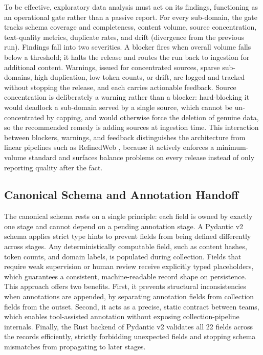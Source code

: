 \documentclass[conference]{IEEEtran}
\begin{document}
To be effective, exploratory data analysis must act on its findings, functioning as an operational gate rather than a passive report. For every sub-domain, the gate tracks schema coverage and completeness, content volume, source concentration, text-quality metrics, duplicate rates, and drift (divergence from the previous run). Findings fall into two severities. A blocker fires when overall volume falls below a threshold; it halts the release and routes the run back to ingestion for additional content. Warnings, issued for concentrated sources, sparse sub-domains, high duplication, low token counts, or drift, are logged and tracked without stopping the release, and each carries actionable feedback. Source concentration is deliberately a warning rather than a blocker: hard-blocking it would deadlock a sub-domain served by a single source, which cannot be un-concentrated by capping, and would otherwise force the deletion of genuine data, so the recommended remedy is adding sources at ingestion time. This interaction between blockers, warnings, and feedback distinguishes the architecture from linear pipelines such as RefinedWeb \cite{penedo2023refinedweb}, because it actively enforces a minimum-volume standard and surfaces balance problems on every release instead of only reporting quality after the fact.

\subsection{Canonical Schema and Annotation Handoff}

The canonical schema rests on a single principle: each field is owned by exactly one stage and cannot depend on a pending annotation stage. A Pydantic v2 schema \cite{pydanticv2} applies strict type hints to prevent fields from being defined differently across stages. Any deterministically computable field, such as content hashes, token counts, and domain labels, is populated during collection. Fields that require weak supervision or human review receive explicitly typed placeholders, which guarantees a consistent, machine-readable record shape on persistence. This approach offers two benefits. First, it prevents structural inconsistencies when annotations are appended, by separating annotation fields from collection fields from the outset. Second, it acts as a precise, static contract between teams, which enables tool-assisted annotation \cite{wang2023selfinstruct} without exposing collection-pipeline internals. Finally, the Rust backend of Pydantic v2 validates all 22 fields across the records efficiently, strictly forbidding unexpected fields and stopping schema mismatches from propagating to later stages.
\end{document}
